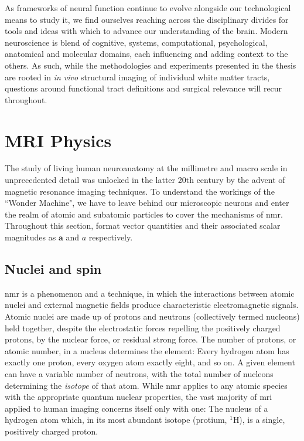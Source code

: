 As frameworks of neural function continue to evolve alongside our technological means to study it, we find ourselves reaching across the disciplinary divides for tools and ideas with which to advance our understanding of the brain.
Modern neuroscience is blend of cognitive, systems, computational, psychological, anatomical and molecular domains, each influencing and adding context to the others.
As such, while the methodologies and experiments presented in the thesis are rooted in \textit{in vivo} structural imaging of individual white matter tracts, questions around functional tract definitions and surgical relevance will recur throughout.

\section{MRI Physics}

The study of living human neuroanatomy at the millimetre and macro scale in unprecedented detail was unlocked in the latter 20th century by the advent of magnetic resonance imaging techniques.
To understand the workings of the ``Wonder Machine", we have to leave behind our microscopic neurons and enter the realm of atomic and subatomic particles to cover the mechanisms of \gls{nmr}.
Throughout this section, format vector quantities and their associated scalar magnitudes as $\mathbf{a}$ and $a$ respectively.

\subsection{Nuclei and spin}

\gls{nmr} is a phenomenon and a technique, in which the interactions between atomic nuclei and external magnetic fields produce characteristic electromagnetic signals.
Atomic nuclei are made up of protons and neutrons (collectively termed nucleons) held together, despite the electrostatic forces repelling the positively charged protons, by the nuclear force, or residual strong force.
The number of protons, or atomic number, in a nucleus determines the element: Every hydrogen atom has exactly one proton, every oxygen atom exactly eight, and so on.
A given element can have a variable number of neutrons, with the total number of nucleons determining the \textit{isotope} of that atom.
While \gls{nmr} applies to any atomic species with the appropriate quantum nuclear properties, the vast majority of \gls{mri} applied to human imaging concerns itself only with one:
The nucleus of a hydrogen atom which, in its most abundant isotope (protium, $^1$H), is a single, positively charged proton.

